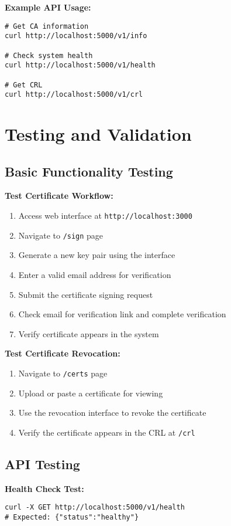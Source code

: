 \textbf{Example API Usage:}
\begin{verbatim}
# Get CA information
curl http://localhost:5000/v1/info

# Check system health
curl http://localhost:5000/v1/health

# Get CRL
curl http://localhost:5000/v1/crl
\end{verbatim}

\section{Testing and Validation}

\subsection{Basic Functionality Testing}

\textbf{Test Certificate Workflow:}
\begin{enumerate}
    \item Access web interface at \texttt{http://localhost:3000}
    \item Navigate to \texttt{/sign} page
    \item Generate a new key pair using the interface
    \item Enter a valid email address for verification
    \item Submit the certificate signing request
    \item Check email for verification link and complete verification
    \item Verify certificate appears in the system
\end{enumerate}

\textbf{Test Certificate Revocation:}
\begin{enumerate}
    \item Navigate to \texttt{/certs} page
    \item Upload or paste a certificate for viewing
    \item Use the revocation interface to revoke the certificate
    \item Verify the certificate appears in the CRL at \texttt{/crl}
\end{enumerate}

\subsection{API Testing}

\textbf{Health Check Test:}
\begin{verbatim}
curl -X GET http://localhost:5000/v1/health
# Expected: {"status":"healthy"}
\end{verbatim}

